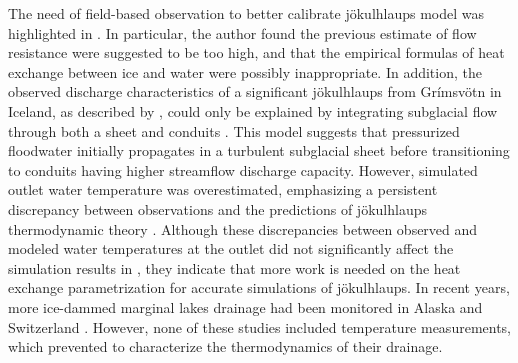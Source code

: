 The need of field-based observation to better calibrate jökulhlaups model was highlighted in \cite{Clarke2003}. In particular, the author found the previous estimate of flow resistance were suggested to be too high, and that the empirical formulas of heat exchange between ice and water were possibly inappropriate. In addition, the observed discharge characteristics of a significant jökulhlaups from Grímsvötn in Iceland, as described by \cite{Bjornsson1996}, could only be explained by integrating subglacial flow through both a sheet and conduits \citep{Flowers&al2004}. This model suggests that pressurized floodwater initially propagates in a turbulent subglacial sheet before transitioning to conduits having higher streamflow discharge capacity. However, simulated outlet water temperature was overestimated, emphasizing a persistent discrepancy between observations and the predictions of jökulhlaups thermodynamic theory \citep[as already indicated by ][]{Clarke2003}. Although these discrepancies between observed and modeled water temperatures at the outlet did not significantly affect the simulation results in \cite{Flowers&al2004}, they indicate that more work is needed on the heat exchange parametrization for accurate simulations of jökulhlaups. In recent years, more ice-dammed marginal lakes drainage had been monitored in Alaska \citep[Hidden Creek Lake, ][]{Anderson&al2003,Anderson&al2005,Walder&al2005,Walder&al2006} and Switzerland \citep{Huss&al2007, Werder&al2010}. However, none of these studies included temperature measurements, which prevented to characterize the thermodynamics of their drainage. 
